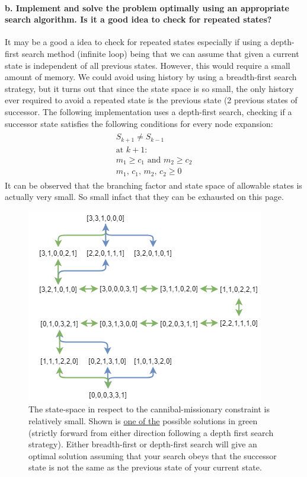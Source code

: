 \documentclass[12pt]{article}
\begin{document}
\paragraph{b. Implement and solve the problem optimally using an appropriate search algorithm. Is it
a good idea to check for repeated states?} It may be a good a idea to check for repeated states especially if using a depth-first search method (infinite loop) being that we can assume that given a current state is independent of all previous states. However, this would require a small amount of memory. We could avoid using history by using a breadth-first search strategy, but it turns out that since the state space is so small, the only history ever required to avoid a repeated state is the previous state (2 previous states of successor.
The following implementation uses a depth-first search, checking if a successor state satisfies the following conditions for every node expansion:
\begin{align}
\begin{split}
S_{k+1} \neq S_{k-1} \\
\text{at }k+1: \\
m_1 \geq c_1 \text{ and } m_2 \geq c_2 \\
m_1,\,c_1,\,m_2,\,c_2 \geq 0
\end{split}
\end{align}
It can be observed that the branching factor and state space of allowable states is actually very small. So small infact that they can be exhausted on this page.
\begin{figure}[h]
\begin{center}
\includegraphics[scale=.75]{c_b_flow}
\caption{The state-space in respect to the cannibal-missionary constraint is relatively small. Shown is \underline{one of the} possible solutions in green (strictly forward from either direction following a depth first search strategy). Either breadth-first or depth-first search will give an optimal solution assuming that your search obeys that the successor state is not the same as the previous state of your current state.}
\end{center}
\end{figure}
\end{document}
